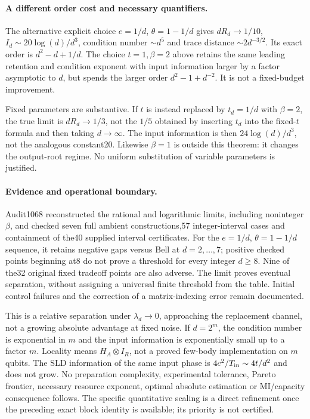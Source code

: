 \paragraph{A different order cost and necessary quantifiers.}
The alternative explicit choice $e=1/d$, $\theta=1-1/d$ gives $dR_d\to1/10$, $I_d\sim20\log(d)/d^3$, condition number $\sim d^5$ and trace distance $\sim2d^{-3/2}$. Its exact order is $d^2-d+1/d$. The choice $t=1,\beta=2$ above retains the same leading retention and condition exponent with input information larger by a factor asymptotic to $d$, but spends the larger order $d^2-1+d^{-2}$. It is not a fixed-budget improvement.

Fixed parameters are substantive. If $t$ is instead replaced by $t_d=1/d$ with $\beta=2$, the true limit is $dR_d\to1/3$, not the $1/5$ obtained by inserting $t_d$ into the fixed-$t$ formula and then taking $d\to\infty$. The input information is then $24\log(d)/d^3$, not the analogous constant20. Likewise $\beta=1$ is outside this theorem: it changes the output-root regime. No uniform substitution of variable parameters is justified.

\paragraph{Evidence and operational boundary.}
Audit1068 reconstructed the rational and logarithmic limits, including noninteger $\beta$, and checked seven full ambient constructions,57 integer-interval cases and containment of the40 supplied interval certificates. For the $e=1/d$, $\theta=1-1/d$ sequence, it retains negative gaps versus Bell at $d=2,\ldots,7$; positive checked points beginning at8 do not prove a threshold for every integer $d\ge8$. Nine of the32 original fixed tradeoff points are also adverse. The limit proves eventual separation, without assigning a universal finite threshold from the table. Initial control failures and the correction of a matrix-indexing error remain documented.

This is a relative separation under $\lambda_d\to0$, approaching the replacement channel, not a growing absolute advantage at fixed noise. If $d=2^m$, the condition number is exponential in $m$ and the input information is exponentially small up to a factor $m$. Locality means $H_A\otimes I_R$, not a proved few-body implementation on $m$ qubits. The SLD information of the same input phase is $4c^2/T_{\rm in}\sim4t/d^2$ and does not grow. No preparation complexity, experimental tolerance, Pareto frontier, necessary resource exponent, optimal absolute estimation or MI/capacity consequence follows. The specific quantitative scaling is a direct refinement once the preceding exact block identity is available; its priority is not certified.
